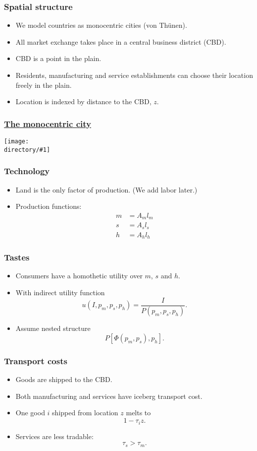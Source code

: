 \documentclass[handout,compress,mathserif]{beamer}
\newcommand{\directory}{figures}
\newcommand{\widefigure}[2]{\begin{frame}\frametitle{\hyperlink{#1back}{#2}}\hypertarget{#1}{{\begin{center}\texttt{[image: \\directory/\#1]}\end{center}}}\end{frame}}
\begin{document}
\begin{frame}\frametitle{Spatial structure}
\begin{itemize}
    \item We model countries as monocentric cities (von Th\"unen).
	\item All market exchange takes place in a central business district (CBD).
	\item CBD is a point in the plain.
	\item Residents, manufacturing and service establishments can choose their location freely in the plain.
	\item Location is indexed by distance to the CBD, $z$.
\end{itemize}
\end{frame}

\widefigure{monocentric-1}{The monocentric city}

\begin{frame}\frametitle{Technology}
\begin{itemize}
    \item Land is the only factor of production. (We add labor later.)
	\item Production functions:
\begin{align*}
m&=A_ml_m\\
s&=A_sl_s\\
h&= A_hl_h
\end{align*}
\end{itemize}
\end{frame}

\begin{frame}\frametitle{Tastes}
\begin{itemize}
    \item Consumers have a homothetic utility over $m$, $s$ and $h$.
    \item With indirect utility function
    \[
    u(I,p_m,p_s,p_h) = \frac{I}{P(p_m,p_s,p_h)}.
    \]
    \item Assume nested structure
    \[
    P[\Phi(p_m,p_s),p_h].
    \]
\end{itemize}
\end{frame}


\begin{frame}\frametitle{Transport costs}
\begin{itemize}
    \item Goods are shipped to the CBD.
    \item Both manufacturing and services have iceberg transport cost.
    \item One good $i$ shipped from location $z$ melts to
    \[
    1-\tau_iz.
    \]
    \item Services are less tradable:
    \[
    \tau_s>\tau_m.
    \]
\end{itemize}
\end{frame}
\end{document}
